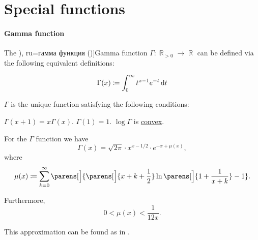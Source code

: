 \section{Special functions}\label{sec:special_functions}

\paragraph{Gamma function}

\begin{definition}\label{def:gamma_function}
  The \term[bg=гама (функция) (\cite[280]{Тагамлицки1978ИнтегралноСмятане}), ru=гамма функция (\cite[406]{Зорич2019АнализЧасть2})]{Gamma function} \( \Gamma: \BbbR_{>0} \to \BbbR \) can be defined via the following equivalent definitions:
  \begin{thmenum}
    \begin{equation}\label{eq:def:gamma_function/direct}
      \Gamma(x) \coloneqq \int_0^\infty t^{x-1} e^{-t} \dl t
    \end{equation}

     \( \Gamma \) is the unique function satisfying the following conditions:
    \begin{thmenum}
       \( \Gamma(x + 1) = x \Gamma(x) \).
       \( \Gamma(1) = 1 \).
       \( \log \Gamma \) is \hyperref[def:convex_function]{convex}.
    \end{thmenum}
  \end{thmenum}
\end{definition}

\begin{theorem}\label{thm:stirlings_gamma_approximation}
  For the \( \Gamma \) function we have
  \begin{equation}\label{eq:thm:stirlings_gamma_approximation}
    \Gamma(x) = \sqrt{2 \pi} \cdot x^{x - 1 / 2} \cdot e^{-x + \mu(x)},
  \end{equation}
  where
  \begin{equation}\label{eq:thm:stirlings_gamma_approximation/mu}
    \mu(x) \coloneqq \sum_{k=0}^\infty \parens[\Big]{ \parens[\Big]{ x + k + \frac 1 2 } \ln\parens[\Big]{ 1 + \frac 1 {x + k} } - 1 }.
  \end{equation}

  Furthermore,
  \begin{equation}\label{eq:thm:stirlings_gamma_approximation/mu_inequality}
    0 < \mu(x) < \frac 1 {12x}.
  \end{equation}
\end{theorem}
\begin{comments}
  \item This approximation can be found as  in \cite{notebook:code}.
\end{comments}

